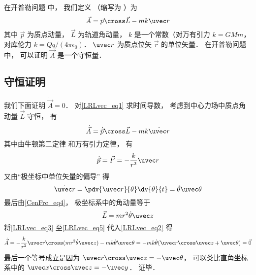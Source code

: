 

在开普勒问题%
中， 我们定义 （缩写为 ）为
\begin{equation}\label{LRLvec_eq1}
\vec A = \vec p \cross \vec L - mk \uvec r
\end{equation}
其中 $\vec p$ 为质点动量， $\vec L$ 为轨道角动量， $k$ 是一个常数（对万有引力 $k = GMm$， 对库伦力 $k = Qq/(4\pi\epsilon_0)$． $\uvec r$ 为质点位矢 $\vec r$ 的单位矢量． 在开普勒问题%
中， 可以证明 $\vec A$ 是一个守恒量．

\subsection{守恒证明}
我们下面证明 $\dot{\vec A} = 0$． 对\autoref{LRLvec_eq1} 求时间导数， 考虑到中心力场中质点角动量 $\vec L$ 守恒， 有
\begin{equation}\label{LRLvec_eq2}
\dot{\vec A} = \dot{\vec p}\cross \vec L  - mk\dot{\uvec r}
\end{equation}
其中由牛顿第二定律 和万有引力定律， 有
\begin{equation}\label{LRLvec_eq3}
\dot{\vec p} = \vec F = - \frac{k}{r^2}\uvec r
\end{equation}
又由“极坐标中单位矢量的偏导” 得
\begin{equation}\label{LRLvec_eq4}
\dot{\uvec r} = \pdv{\uvec r}{\theta} \dv{\theta}{t} = \dot\theta\uvec \theta
\end{equation}
最后由\autoref{CenFrc_eq4}， 极坐标系中的角动量等于
\begin{equation}\label{LRLvec_eq5}
\vec L = mr^2\dot \theta \uvec z
\end{equation}
将\autoref{LRLvec_eq3} 至\autoref{LRLvec_eq5} 代入\autoref{LRLvec_eq2} 得
\begin{equation}
\dot{\vec A} = -\frac{k}{r^2}\uvec r \cross (mr^2\dot\theta\uvec z) - mk\dot\theta\uvec\theta
=-mk\dot\theta (\uvec r\cross \uvec z + \uvec \theta)
= \vec 0
\end{equation}
最后一个等号成立是因为 $\uvec r\cross\uvec z = -\uvec\theta$， 可以类比直角坐标系中的 $\uvec x\cross\uvec z = -\uvec y$． 证毕．

